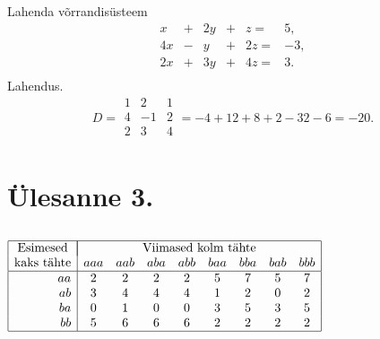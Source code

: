 \documentclass[a4paper,fleqn,12pt]{article}
\theoremstyle{definition}
\begin{document}
\subsection*{}

Lahenda võrrandisüsteem
\begin{displaymath}
  \begin{array}{*{7}{r}}
    x  & + & 2y & + &  z = &  5, \\
    4x & - &  y & + & 2z = & -3, \\
    2x & + & 3y & + & 4z = &  3. \\
  \end{array}
\end{displaymath}
Lahendus.
\begin{displaymath}
	D = 
	\begin{array}{|*{3}{r}|}
	1 & 2 & 1 \\
	4 & -1 & 2 \\
	2 & 3 & 4 \\
	\end{array}
	= -4 +12 +8 +2 -32 -6 = -20.
\end{displaymath}
\section{Ülesanne 3.}


\subsection*{}

\begin{center}
  $\begin{array}{ | r | *{8}{c} | }
    \hline
    \multicolumn{1}{|c|}{\text{Esimesed}} & \multicolumn{8}{|c|}{\text{Viimased kolm tähte}} \\
    \text{kaks tähte} & aaa & aab & aba & abb & baa & bba & bab & bbb \\ \hline
    aa & 2 & 2 & 2 & 2 & 5 & 7 & 5 & 7 \\
    ab & 3 & 4 & 4 & 4 & 1 & 2 & 0 & 2 \\
    ba & 0 & 1 & 0 & 0 & 3 & 5 & 3 & 5 \\
    bb & 5 & 6 & 6 & 6 & 2 & 2 & 2 & 2 \\
    \hline
  \end{array}$
\end{center}

\subsection*{}
\end{document}
